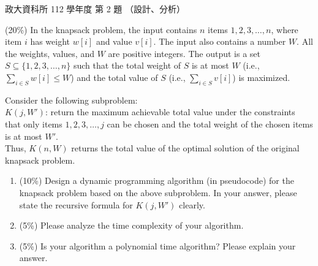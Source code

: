 \begin{pastexam}[label={px:nccu-112-dsa-02}]{政大資科所 112 學年度 第 2 題}
（設計、分析）

(20\%) In the knapsack problem, the input contains $n$ items $1,2,3,\dots,n$, where item $i$ has
weight $w[i]$ and value $v[i]$. The input also contains a number $W$. All the weights, values, and
$W$ are positive integers. The output is a set $S\subseteq\{1,2,3,\dots,n\}$ such that the total
weight of $S$ is at most $W$ (i.e., $\sum_{i\in S}w[i]\le W$) and the total value of $S$ (i.e.,
$\sum_{i\in S}v[i]$) is maximized.

Consider the following subproblem:\\
$K(j,W')$: return the maximum achievable total value under the constraints that only items
$1,2,3,\dots,j$ can be chosen and the total weight of the chosen items is at most $W'$.\\
Thus, $K(n,W)$ returns the total value of the optimal solution of the original knapsack problem.
\begin{enumerate}[label=\arabic*),itemsep=2pt,topsep=2pt]
\item (10\%) Design a dynamic programming algorithm (in pseudocode) for the knapsack problem based
on the above subproblem. In your answer, please state the recursive formula for $K(j,W')$ clearly.
\item (5\%) Please analyze the time complexity of your algorithm.
\item (5\%) Is your algorithm a polynomial time algorithm? Please explain your answer.
\end{enumerate}
\end{pastexam}

